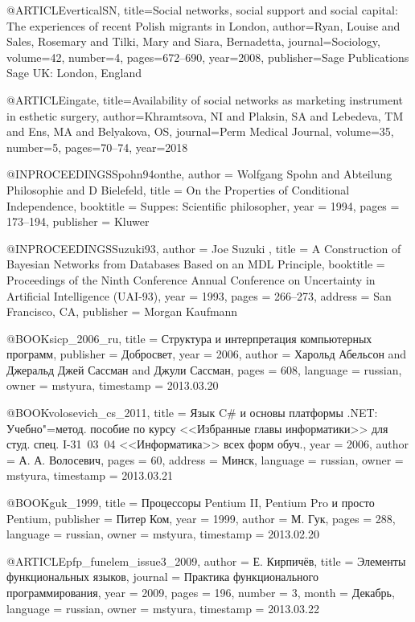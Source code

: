 @ARTICLE{verticalSN,
  title={Social networks, social support and social capital: The experiences of recent Polish migrants in London},
  author={Ryan, Louise and Sales, Rosemary and Tilki, Mary and Siara, Bernadetta},
  journal={Sociology},
  volume={42},
  number={4},
  pages={672--690},
  year={2008},
  publisher={Sage Publications Sage UK: London, England}
}

@ARTICLE{ingate,
  title={Availability of social networks as marketing instrument in esthetic surgery},
  author={Khramtsova, NI and Plaksin, SA and Lebedeva, TM and Ens, MA and Belyakova, OS},
  journal={Perm Medical Journal},
  volume={35},
  number={5},
  pages={70--74},
  year={2018}
}

@INPROCEEDINGS{Spohn94onthe,
  author = {Wolfgang Spohn and Abteilung Philosophie and D Bielefeld},
  title = {On the Properties of Conditional Independence},
  booktitle = {Suppes: Scientific philosopher},
  year = {1994},
  pages = {173--194},
  publisher = {Kluwer}
}

@INPROCEEDINGS{Suzuki93,
  author = {Joe Suzuki },
  title = {A Construction of Bayesian Networks from Databases Based on an MDL
	Principle},
  booktitle = {Proceedings of the Ninth Conference Annual Conference on Uncertainty
	in Artificial Intelligence (UAI-93)},
  year = {1993},
  pages = {266--273},
  address = {San Francisco, CA},
  publisher = {Morgan Kaufmann}
}

@BOOK{sicp_2006_ru,
  title = {Структура и интерпретация компьютерных программ},
  publisher = {Добросвет},
  year = {2006},
  author = {Харольд Абельсон and Джеральд Джей Сассман and Джули Сассман},
  pages = {608},
  language = {russian},
  owner = {mstyura},
  timestamp = {2013.03.20}
}

@BOOK{volosevich_cs_2011,
  title = {Язык C\# и основы платформы .NET: Учебно"=метод. пособие по курсу
	<<Избранные главы информатики>> для студ. спец. \mbox{I-31~03~04}
	<<Информатика>> всех форм обуч.},
  year = {2006},
  author = {А. А. Волосевич},
  pages = {60},
  address = {Минск},
  language = {russian},
  owner = {mstyura},
  timestamp = {2013.03.21}
}

@BOOK{guk_1999,
  title = {Процессоры Pentium II, Pentium Pro и просто Pentium},
  publisher = {Питер Ком},
  year = {1999},
  author = {М. Гук},
  pages = {288},
  language = {russian},
  owner = {mstyura},
  timestamp = {2013.02.20}
}

@ARTICLE{pfp_funelem_issue3_2009,
  author = {Е. Кирпичёв},
  title = {Элементы функциональных языков},
  journal = {Практика функционального программирования},
  year = {2009},
  pages = {196},
  number = {3},
  month = {Декабрь},
  language = {russian},
  owner = {mstyura},
  timestamp = {2013.03.22}
}

